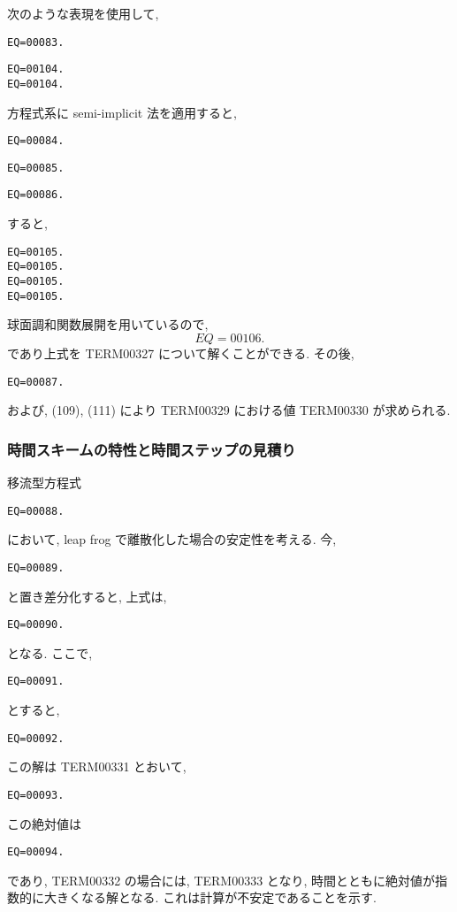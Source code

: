 次のような表現を使用して,
%
\begin{verbatim}
EQ=00083.
\end{verbatim}
%
\begin{verbatim}
EQ=00104.
EQ=00104.
\end{verbatim}
%
方程式系に semi-implicit 法を適用すると,
%
\begin{verbatim}
EQ=00084.
\end{verbatim}
%
\begin{verbatim}
EQ=00085.
\end{verbatim}
%
\begin{verbatim}
EQ=00086.
\end{verbatim}


すると, 
%
\begin{verbatim}
EQ=00105.
EQ=00105.
EQ=00105.
EQ=00105.
\end{verbatim}

球面調和関数展開を用いているので,
\[
EQ=00106.
\]
であり上式を TERM00327 について解くことができる.
%
その後,
%
\begin{verbatim}
EQ=00087.
\end{verbatim}
%
および, (109), (111)
により TERM00329 における値 TERM00330
が求められる.

\subsubsection{時間スキームの特性と時間ステップの見積り}

移流型方程式 
\begin{verbatim}
EQ=00088.
\end{verbatim}
において,  leap frog で離散化した場合の安定性を考える.
今, 
\begin{verbatim}
EQ=00089.
\end{verbatim}
と置き差分化すると, 上式は,
\begin{verbatim}
EQ=00090.
\end{verbatim}
となる.
ここで,
\begin{verbatim}
EQ=00091.
\end{verbatim}
とすると,
\begin{verbatim}
EQ=00092.
\end{verbatim}
この解は TERM00331 とおいて,
\begin{verbatim}
EQ=00093.
\end{verbatim}

この絶対値は
\begin{verbatim}
EQ=00094.
\end{verbatim}
であり, TERM00332 の場合には, TERM00333 となり,
時間とともに絶対値が指数的に大きくなる解となる.
これは計算が不安定であることを示す.

